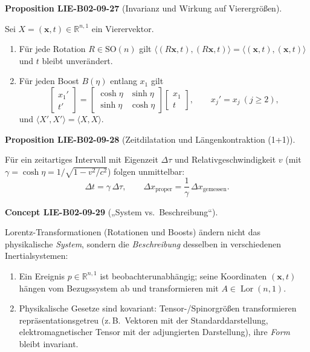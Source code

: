 \documentclass[10pt, letterpaper]{article}
\newcommand{\CustomHeading}[3]{%
  \par\medskip\noindent%
  \textbf{#1 #2} \textnormal{(#3)}.\enskip%
}
\newenvironment{PROP}[2]{\begin{unitbox}\CustomHeading{Proposition}{#1}{#2}}{\end{unitbox}}
\newenvironment{CONC}[2]{\begin{unitbox}\CustomHeading{Concept}{#1}{#2}}{\end{unitbox}}
\begin{document}
\begin{PROP}{LIE-B02-09-27}{Invarianz und Wirkung auf Vierergrößen}
Sei $X=(\mathbf x,t)\in\mathbb{R}^{n,1}$ ein Vierervektor.
\begin{enumerate}
\item Für jede Rotation $R\in\mathrm{SO}(n)$ gilt 
$\langle (R\mathbf x,t),(R\mathbf x,t)\rangle = \langle (\mathbf x,t),(\mathbf x,t)\rangle$ und $t$ bleibt unverändert.
\item Für jeden Boost $B(\eta)$ entlang $x_1$ gilt
\[
\begin{bmatrix}
x_1'\\ t'
\end{bmatrix}
=
\begin{bmatrix}
\cosh\eta & \sinh\eta\\
\sinh\eta & \cosh\eta
\end{bmatrix}
\begin{bmatrix}
x_1\\ t
\end{bmatrix},
\qquad 
x_j'=x_j\ (j\ge 2),
\]
und $\langle X',X'\rangle=\langle X,X\rangle$.
\end{enumerate}
\end{PROP}



\begin{PROP}{LIE-B02-09-28}{Zeitdilatation und Längenkontraktion (1+1)}
Für ein zeitartiges Intervall mit Eigenzeit $\Delta\tau$ und Relativgeschwindigkeit $v$ (mit $\gamma=\cosh\eta=1/\sqrt{1-v^2/c^2}$) folgen unmittelbar:
\[
\Delta t = \gamma\,\Delta\tau,
\qquad
\Delta x_{\text{proper}} = \frac{1}{\gamma}\,\Delta x_{\text{gemessen}}.
\]
\end{PROP}



\begin{CONC}{LIE-B02-09-29}{„System vs.\ Beschreibung“}
Lorentz-Transformationen (Rotationen und Boosts) ändern nicht das physikalische \emph{System}, sondern die \emph{Beschreibung} desselben in verschiedenen Inertialsystemen:
\begin{enumerate}
\item Ein Ereignis $p\in\mathbb{R}^{n,1}$ ist beobachterunabhängig; seine Koordinaten $(\mathbf x,t)$ hängen vom Bezugssystem ab und transformieren mit $A\in\operatorname{Lor}(n,1)$.
\item Physikalische Gesetze sind kovariant: Tensor-/Spinorgrößen transformieren repräsentationsgetreu (z.\,B.\ Vektoren mit der Standarddarstellung, elektromagnetischer Tensor mit der adjungierten Darstellung), ihre \emph{Form} bleibt invariant.
\end{enumerate}
\end{CONC}
\end{document}

